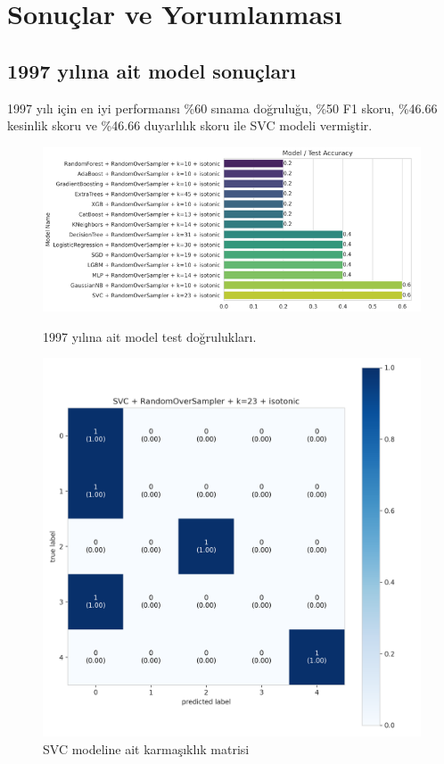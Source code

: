 \section{Sonuçlar ve Yorumlanması}

\subsection{1997 yılına ait model sonuçları}
1997 yılı için en iyi performansı \%60 sınama doğruluğu,  \%50 F1 skoru, \%46.66 kesinlik skoru ve \%46.66 duyarlılık skoru ile SVC modeli vermiştir.

\begin{figure}[ht]
\centering
\begin{minipage}[b]{0.6\textwidth}
    \centering
    \includegraphics[width=\textwidth]{1997.png}
    \caption{1997 yılına ait model test doğrulukları.}
    \label{fig:resim1}
\end{minipage}
\hfill
\begin{minipage}[b]{0.6\textwidth}
    \centering
    \includegraphics[width=\textwidth]{1997_cm.png}
    \caption{SVC modeline ait karmaşıklık matrisi}
    \label{fig:resim2}
\end{minipage}
\end{figure}

